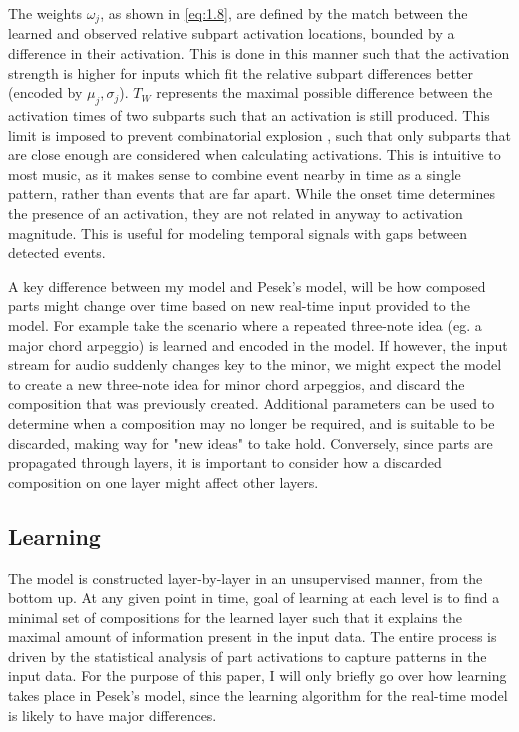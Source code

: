\documentclass[../main.tex]{subfiles}
\begin{document}
\vspace{0.5cm}
The weights $\omega_j$, as shown in \ref{eq:1.8}, are defined by the match between the learned and observed relative subpart activation locations, bounded by a difference in their activation. This is done in this manner such that the activation strength is higher for inputs which fit the relative subpart differences better (encoded by $\mu_j, \sigma_j$). $T_W$ represents the maximal possible difference between the activation times of two subparts such that an activation is still produced. This limit is imposed to prevent combinatorial explosion \cite{Pesek:1}, such that only subparts that are close enough are considered when calculating activations. This is intuitive to most music, as it makes sense to combine event nearby in time as a single pattern, rather than events that are far apart. While the onset time determines the presence of an activation, they are not related in anyway to activation magnitude. This is useful for modeling temporal signals with gaps between detected events. 

\vspace{0.5cm}
A key difference between my model and Pesek's model, will be how composed parts might change over time based on new real-time input provided to the model. For example take the scenario where a repeated three-note idea (eg. a major chord arpeggio) is learned and encoded in the model. If however, the input stream for audio suddenly changes key to the minor, we might expect the model to create a new three-note idea for minor chord arpeggios, and discard the composition that was previously created. Additional parameters can be used to determine when a composition may no longer be required, and is suitable to be discarded, making way for "new ideas" to take hold. Conversely, since parts are propagated through layers, it is important to consider how a discarded composition on one layer might affect other layers. 

\subsection{Learning}
\noindent
The model is constructed layer-by-layer in an unsupervised manner, from the bottom up. At any given point in time, goal of learning at each level is to find a minimal set of compositions for the learned layer such that it explains the maximal amount of information present in the input data. The entire process is driven by the statistical analysis of part activations to capture patterns in the input data. For the purpose of this paper, I will only briefly go over how learning takes place in Pesek's model, since the learning algorithm for the real-time model is likely to have major differences. 
\end{document}
